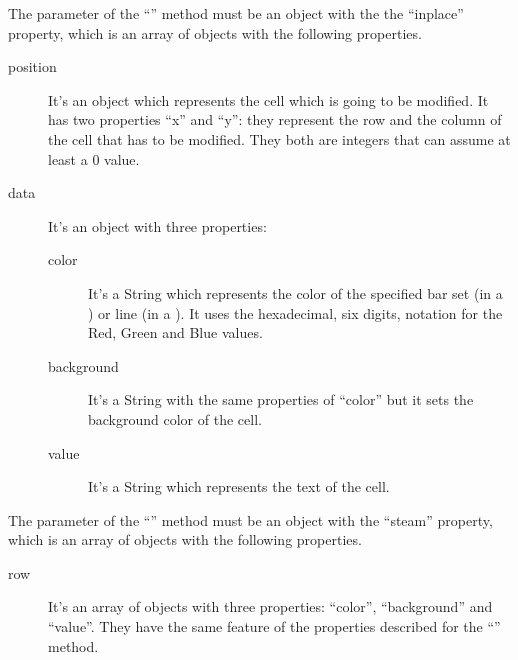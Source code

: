 				The parameter of the “” method must be an object with the the “inplace” property, which is an array of objects with the following properties. 
				\begin{description}
					\item[position] It's an object which represents the cell which is going to be modified. It has two properties “x” and “y”: they represent the row and the column of the cell that has to be modified. They both are integers that can assume at least a 0 value.
					\item[data] It's an object with three properties:
					\begin{description}
						\item[color] It's a String which represents the color of the specified bar set (in a ) or line (in a ). It uses the hexadecimal, six digits, notation for the Red, Green and Blue values. 
						\item[background] It's a String with the same properties of “color” but it sets the background color of the cell.
						\item[value] It's a String which represents the text of the cell.
					\end{description}
				\end{description}
				The parameter of the “” method must be an object with the “steam” property, which is an array of objects with the following properties.
				\begin{description}
					\item[row] It's an array of objects with three properties: “color”, “background” and “value”. They have the same feature of the properties described for the “” method.
				\end{description}